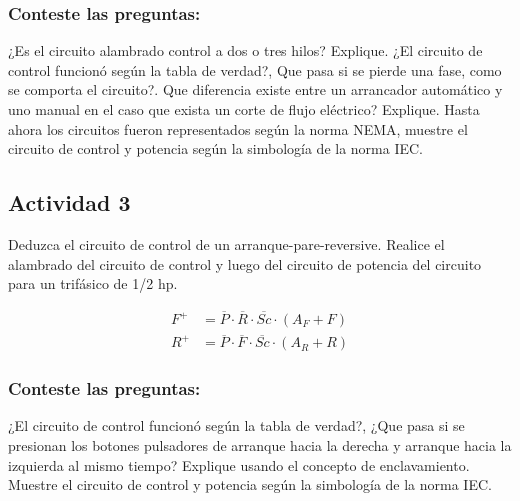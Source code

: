  
\subsubsection{Conteste las preguntas:}

¿Es el circuito alambrado control a dos o tres hilos? Explique. ¿El circuito de control funcionó según la tabla de verdad?, Que pasa si se pierde una fase, como se comporta el circuito?. Que diferencia existe entre un arrancador automático y uno manual en el caso que exista un corte de flujo eléctrico? Explique.
 Hasta ahora los circuitos fueron representados según la norma NEMA, muestre el circuito de control y potencia según la simbología de la norma IEC.

\subsection{Actividad 3}

Deduzca el circuito de control de un arranque-pare-reversive. Realice el alambrado del circuito de control y luego del circuito de potencia del circuito para un trifásico de 1/2 hp.


 \begin{align*}
    F^+ &= \overline{P} \cdot \overline{R} \cdot \overline{Sc} \cdot (A_F + F) \\
    R^+ &= \overline{P} \cdot \overline{F} \cdot \overline{Sc} \cdot (A_R + R)
 \end{align*}

 \begin{figure}[H]
    \centering
 \end{figure}

\subsubsection{Conteste las preguntas:} 

 ¿El circuito de control funcionó según la tabla de verdad?, ¿Que pasa si se presionan los botones pulsadores de arranque hacia la derecha y arranque hacia la izquierda al mismo tiempo? Explique usando el concepto de enclavamiento. 
 Muestre el circuito de control y potencia según la simbología de la norma IEC.



